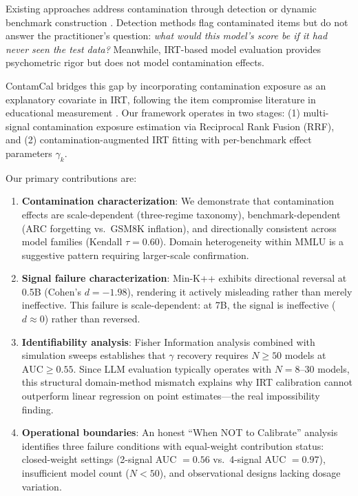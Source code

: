 \documentclass[11pt,a4paper]{article}
\begin{document}
Existing approaches address contamination through detection \cite{shi2024detecting,golchin2024time,yang2023rethinking} or dynamic benchmark construction \cite{white2024livebench}. Detection methods flag contaminated items but do not answer the practitioner's question: \emph{what would this model's score be if it had never seen the test data?} Meanwhile, IRT-based model evaluation \cite{lalor2024benchmarking,polo2024tinybenchmarks} provides psychometric rigor but does not model contamination effects.

ContamCal bridges this gap by incorporating contamination exposure as an explanatory covariate in IRT, following the item compromise literature in educational measurement \cite{eckerly2017detecting,sinharay2017assessing}. Our framework operates in two stages: (1) multi-signal contamination exposure estimation via Reciprocal Rank Fusion (RRF), and (2) contamination-augmented IRT fitting with per-benchmark effect parameters $\gamma_k$.

Our primary contributions are:
\begin{enumerate}
\item \textbf{Contamination characterization}: We demonstrate that contamination effects are scale-dependent (three-regime taxonomy), benchmark-dependent (ARC forgetting vs.\ GSM8K inflation), and directionally consistent across model families (Kendall $\tau = 0.60$). Domain heterogeneity within MMLU is a suggestive pattern requiring larger-scale confirmation.
\item \textbf{Signal failure characterization}: Min-K++ exhibits directional reversal at 0.5B (Cohen's $d = -1.98$), rendering it actively misleading rather than merely ineffective. This failure is scale-dependent: at 7B, the signal is ineffective ($d \approx 0$) rather than reversed.
\item \textbf{Identifiability analysis}: Fisher Information analysis combined with simulation sweeps establishes that $\gamma$ recovery requires $N \geq 50$ models at $\text{AUC} \geq 0.55$. Since LLM evaluation typically operates with $N = 8$--$30$ models, this structural domain-method mismatch explains why IRT calibration cannot outperform linear regression on point estimates---the real impossibility finding.
\item \textbf{Operational boundaries}: An honest ``When NOT to Calibrate'' analysis identifies three failure conditions with equal-weight contribution status: closed-weight settings (2-signal AUC $= 0.56$ vs.\ 4-signal AUC $= 0.97$), insufficient model count ($N < 50$), and observational designs lacking dosage variation.
\end{enumerate}
\end{document}
